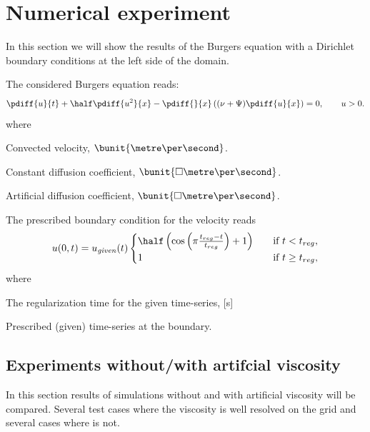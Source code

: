 \chapter{Numerical experiment}
In this section we will show the results of the Burgers equation with a Dirichlet boundary conditions at the left side of the domain.

The considered Burgers equation reads:
\begin{align}
    \pdiff{u}{t} + \half \pdiff{u^2}{x} - \pdiff{}{x}\left( (\nu+\Psi) \pdiff{u}{x}\right)= 0, \qquad u>0. \label{eq:1d_advection_art_diff}
\end{align}
where
\begin{symbollist}
    \item[$u$] Convected velocity, $\bunit{\metre\per\second}$.
    \item[$\nu$] Constant diffusion coefficient, $\bunit{\square\metre\per\second}$.
    \item[$\Psi(t)$] Artificial diffusion coefficient, $\bunit{\square\metre\per\second}$.
\end{symbollist}
The prescribed boundary condition for the velocity reads
\begin{align}
    u(0,t) = u_{\it given}(t)
    \begin{cases}
        \half \left(\cos\left(\pi \frac{t_{reg} - t}{t_{reg}} \right) + 1\right) &\quad \text{if } t < t_{reg},
        \\
        1 &\quad \text{if } t \geq t_{reg},
    \end{cases}
    \label{eq:1d_burgers_boundary_condition}
\end{align}
where
\begin{symbollist}
    \item[$t_{reg}$] The regularization time for the given time-series, [\si{\second}]
    \item[$u_{\it given}(t)$] Prescribed (given) time-series at the boundary.
\end{symbollist}

\section{Experiments without/with artifcial viscosity}
In this section results of simulations without and with artificial viscosity will be compared.
Several test cases where the viscosity is well resolved on the grid and several cases where is not.

